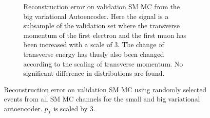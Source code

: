 \begin{figure}[h!]
\begin{subfigure}{.45\textwidth}
        \caption{Reconstruction error on validation SM MC from the big variational Autoencoder. Here the signal is a subsample of the validation 
        set where the transverse momentum of the first electron and the first muon has been increased with a scale of $3$. The change of transverse 
        energy has thusly also been changed according to the scaling of transverse momentum. No significant difference in distributions are found. }
        \label{fig:VAE_big_pt_3}
    \end{subfigure}
    \hfill 
    \caption[VAE | Reconstruction error $p_T$ altering of 3]{Reconstruction error on validation SM MC using randomly selected events from all SM 
    MC channels for the small and big variational autoencoder. $p_T$ is scaled by 3. }
    \label{fig:VAE_big_small_pt_3}
\end{figure}

